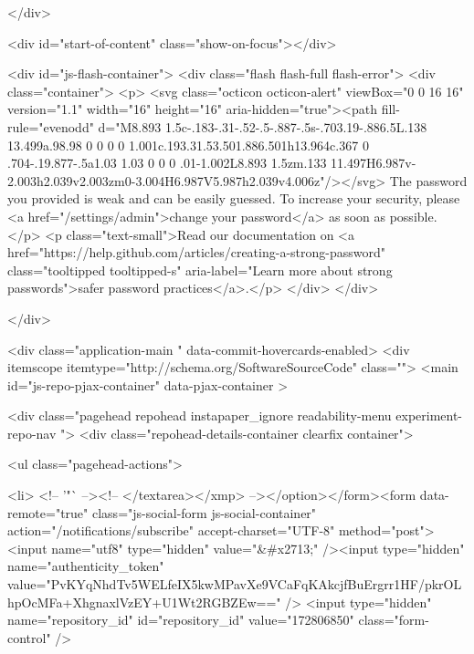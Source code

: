       

  </div>

  <div id="start-of-content" class="show-on-focus"></div>

    <div id="js-flash-container">
    <div class="flash flash-full flash-error">
  <div class="container">
      <p>
        <svg class="octicon octicon-alert" viewBox="0 0 16 16" version="1.1" width="16" height="16" aria-hidden="true"><path fill-rule="evenodd" d="M8.893 1.5c-.183-.31-.52-.5-.887-.5s-.703.19-.886.5L.138 13.499a.98.98 0 0 0 0 1.001c.193.31.53.501.886.501h13.964c.367 0 .704-.19.877-.5a1.03 1.03 0 0 0 .01-1.002L8.893 1.5zm.133 11.497H6.987v-2.003h2.039v2.003zm0-3.004H6.987V5.987h2.039v4.006z"/></svg> The password  you provided is weak and can be easily guessed.
          To increase your security, please <a href="/settings/admin">change your password</a> as soon as possible.
      </p>
      <p class="text-small">Read our documentation on <a href="https://help.github.com/articles/creating-a-strong-password" class="tooltipped tooltipped-s" aria-label="Learn more about strong passwords">safer password practices</a>.</p>
  </div>
</div>


</div>



  <div class="application-main " data-commit-hovercards-enabled>
        <div itemscope itemtype="http://schema.org/SoftwareSourceCode" class="">
    <main id="js-repo-pjax-container" data-pjax-container >
      


  






  <div class="pagehead repohead instapaper_ignore readability-menu experiment-repo-nav  ">
    <div class="repohead-details-container clearfix container">

      <ul class="pagehead-actions">



  <li>
        <!-- '"` --><!-- </textarea></xmp> --></option></form><form data-remote="true" class="js-social-form js-social-container" action="/notifications/subscribe" accept-charset="UTF-8" method="post"><input name="utf8" type="hidden" value="&#x2713;" /><input type="hidden" name="authenticity_token" value="PvKYqNhdTv5WELfeIX5kwMPavXe9VCaFqKAkcjfBuErgrr1HF/pkrOLhpOcMFa+XhgnaxlVzEY+U1Wt2RGBZEw==" />      <input type="hidden" name="repository_id" id="repository_id" value="172806850" class="form-control" />

